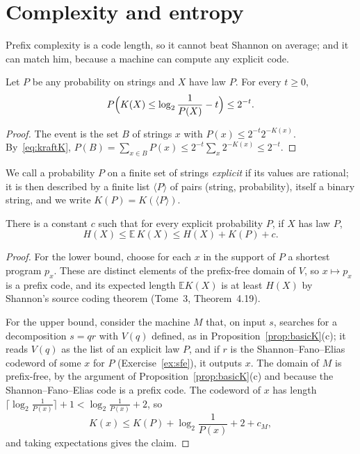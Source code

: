 \section{Complexity and entropy}\label{sec:entropy}

Prefix complexity is a code length, so it cannot beat Shannon on average; and it can match him, because a machine can compute any explicit code.

\begin{proposition}\label{prop:competitive}
Let $P$ be any probability on strings and $X$ have law $P$. For every $t\ge0$,
\[
P\Bigl(K(X)\le\log_2\frac1{P(X)}-t\Bigr)\le2^{-t}.
\]
\end{proposition}

\begin{proof}
The event is the set $B$ of strings $x$ with $P(x)\le2^{-t}2^{-K(x)}$. By~\eqref{eq:kraftK}, $P(B)=\sum_{x\in B}P(x)\le2^{-t}\sum_x2^{-K(x)}\le2^{-t}$.
\end{proof}

We call a probability $P$ on a finite set of strings \emph{explicit} if its values are rational; it is then described by a finite list $\langle P\rangle$ of pairs (string, probability), itself a binary string, and we write $K(P)=K(\langle P\rangle)$.

\begin{theorem}\label{thm:KH}
There is a constant $c$ such that for every explicit probability $P$, if $X$ has law $P$,
\[
H(X)\le\mathbb E\,K(X)\le H(X)+K(P)+c.
\]
\end{theorem}

\begin{proof}
For the lower bound, choose for each $x$ in the support of $P$ a shortest program $p_x$. These are distinct elements of the prefix-free domain of $V$, so $x\mapsto p_x$ is a prefix code, and its expected length $\mathbb EK(X)$ is at least $H(X)$ by Shannon's source coding theorem (Tome~3, Theorem~4.19).

For the upper bound, consider the machine $M$ that, on input $s$, searches for a decomposition $s=qr$ with $V(q)$ defined, as in Proposition~\ref{prop:basicK}(c); it reads $V(q)$ as the list of an explicit law $P$, and if $r$ is the Shannon--Fano--Elias codeword of some $x$ for $P$ (Exercise~\ref{ex:sfe}), it outputs $x$. The domain of $M$ is prefix-free, by the argument of Proposition~\ref{prop:basicK}(c) and because the Shannon--Fano--Elias code is a prefix code. The codeword of $x$ has length $\lceil\log_2\frac1{P(x)}\rceil+1<\log_2\frac1{P(x)}+2$, so
\[
K(x)\le K(P)+\log_2\frac1{P(x)}+2+c_M,
\]
and taking expectations gives the claim.
\end{proof}

